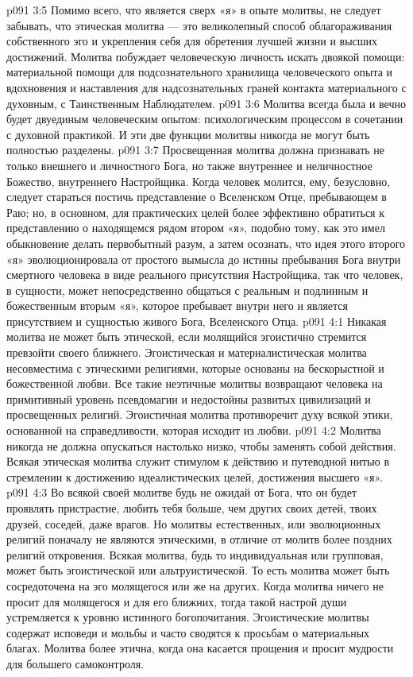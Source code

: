 \vs p091 3:5 Помимо всего, что является сверх «я» в опыте молитвы, не следует забывать, что этическая молитва --- это великолепный способ облагораживания собственного эго и укрепления себя для обретения лучшей жизни и высших достижений. Молитва побуждает человеческую личность искать двоякой помощи: материальной помощи для подсознательного хранилища человеческого опыта и вдохновения и наставления для надсознательных граней контакта материального с духовным, с Таинственным Наблюдателем.
\vs p091 3:6 Молитва всегда была и вечно будет двуединым человеческим опытом: психологическим процессом в сочетании с духовной практикой. И эти две функции молитвы никогда не могут быть полностью разделены.
\vs p091 3:7 Просвещенная молитва должна признавать не только внешнего и личностного Бога, но также внутреннее и неличностное Божество, внутреннего Настройщика. Когда человек молится, ему, безусловно, следует стараться постичь представление о Вселенском Отце, пребывающем в Раю; но, в основном, для практических целей более эффективно обратиться к представлению о находящемся рядом втором «я», подобно тому, как это имел обыкновение делать первобытный разум, а затем осознать, что идея этого второго «я» эволюционировала от простого вымысла до истины пребывания Бога внутри смертного человека в виде реального присутствия Настройщика, так что человек, в сущности, может непосредственно общаться с реальным и подлинным и божественным вторым «я», которое пребывает внутри него и является присутствием и сущностью живого Бога, Вселенского Отца.
\vs p091 4:1 Никакая молитва не может быть этической, если молящийся эгоистично стремится превзойти своего ближнего. Эгоистическая и материалистическая молитва несовместима с этическими религиями, которые основаны на бескорыстной и божественной любви. Все такие неэтичные молитвы возвращают человека на примитивный уровень псевдомагии и недостойны развитых цивилизаций и просвещенных религий. Эгоистичная молитва противоречит духу всякой этики, основанной на справедливости, которая исходит из любви.
\vs p091 4:2 Молитва никогда не должна опускаться настолько низко, чтобы заменять собой действия. Всякая этическая молитва служит стимулом к действию и путеводной нитью в стремлении к достижению идеалистических целей, достижения высшего «я».
\vs p091 4:3 Во всякой своей молитве будь  не ожидай от Бога, что он будет проявлять пристрастие, любить тебя больше, чем других своих детей, твоих друзей, соседей, даже врагов. Но молитвы естественных, или эволюционных религий поначалу не являются этическими, в отличие от молитв более поздних религий откровения. Всякая молитва, будь то индивидуальная или групповая, может быть эгоистической или альтруистической. То есть молитва может быть сосредоточена на эго молящегося или же на других. Когда молитва ничего не просит для молящегося и для его ближних, тогда такой настрой души устремляется к уровню истинного богопочитания. Эгоистические молитвы содержат исповеди и мольбы и часто сводятся к просьбам о материальных благах. Молитва более этична, когда она касается прощения и просит мудрости для большего самоконтроля.

